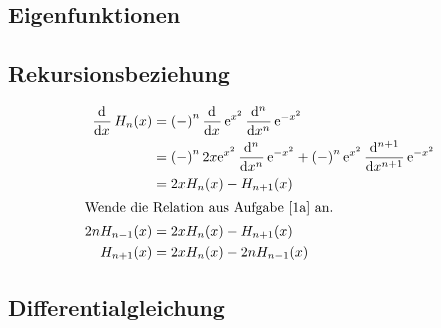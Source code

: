 \subsection{Eigenfunktionen}

\fehlt

\subsection{Rekursionsbeziehung}

\begin{align*}
	\dod{}x H_n(x)
	&= \del-^n \dod{}x \ee^{x^2} \dod[n]{}x \ee^{-x^2} \\
	&= \del-^n 2x \ee^{x^2} \dod[n]{}x \ee^{-x^2} + \del-^n \ee^{x^2} \dod[n+1]{}x \ee^{-x^2} \\
	&= 2x H_n(x) - H_{n+1}(x) \\
	\intertext{%
		Wende die Relation aus Aufgabe \ref{1a} an.
	}
	2n H_{n-1}(x)
	&= 2x H_n(x) - H_{n+1}(x) \\
	H_{n+1}(x)
	&= 2x H_n(x) - 2n H_{n-1}(x)
\end{align*}

\subsection{Differentialgleichung}

\fehlt


\IfFileExists{\bibliographyfile}{
	
}{}



